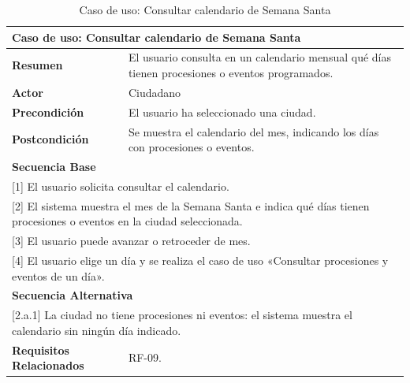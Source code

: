 \begin{table}[h!]
    \centering
    \renewcommand{\arraystretch}{1.5}

    \begin{tabular}{|p{4cm}|p{11cm}|}
        \hline
        \multicolumn{2}{|l|}{\textbf{Caso de uso: Consultar calendario de Semana Santa}} \\
        \hline
        \textbf{Resumen} & El usuario consulta en un calendario mensual qué días tienen procesiones o eventos programados. \\
        \hline
        \textbf{Actor} & Ciudadano \\
        \hline
        \textbf{Precondición} & El usuario ha seleccionado una ciudad. \\
        \hline
        \textbf{Postcondición} & Se muestra el calendario del mes, indicando los días con procesiones o eventos. \\
        \hline
        \multicolumn{2}{|l|}{\textbf{Secuencia Base}} \\
        \hline
        \multicolumn{2}{|p{15cm}|}{ [1] El usuario solicita consultar el calendario. } \\
        \hline
        \multicolumn{2}{|p{15cm}|}{ [2] El sistema muestra el mes de la Semana Santa e indica qué días tienen procesiones o eventos en la ciudad seleccionada. } \\
        \hline
        \multicolumn{2}{|p{15cm}|}{ [3] El usuario puede avanzar o retroceder de mes. } \\
        \hline
        \multicolumn{2}{|p{15cm}|}{ [4] El usuario elige un día y se realiza el caso de uso «Consultar procesiones y eventos de un día». } \\
        \hline
        \multicolumn{2}{|l|}{\textbf{Secuencia Alternativa}} \\
        \hline
        \multicolumn{2}{|p{15cm}|}{ [2.a.1] La ciudad no tiene procesiones ni eventos: el sistema muestra el calendario sin ningún día indicado. } \\
        \hline
        \textbf{Requisitos Relacionados} & RF-09. \\
        \hline
    \end{tabular}
    \caption{Caso de uso: Consultar calendario de Semana Santa}
\end{table}

